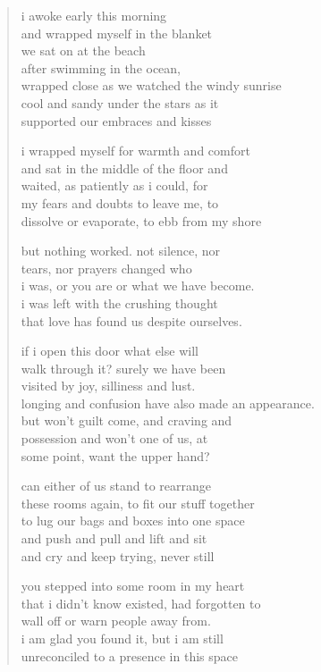 
\begin{verse} %
i awoke early this morning \\
and wrapped myself in the blanket \\
we sat on at the beach \\
after swimming in the ocean, \\
wrapped close as we watched the windy sunrise \\
cool and sandy under the stars as it \\
supported our embraces and kisses

i wrapped myself for warmth and comfort \\
and sat in the middle of the floor and \\
waited, as patiently as i could, for  \\
my fears and doubts to leave me, to  \\
dissolve or evaporate, to ebb from my shore

but nothing worked. not silence, nor \\
tears, nor prayers changed who \\
i was, or you are or what we have become. \\
i was left with the crushing thought \\
that love has found us despite ourselves.

if i open this door what else will  \\
walk through it? surely we have been \\
visited by joy, silliness and lust. \\
longing and confusion have also made an appearance. \\
but won't guilt come, and craving and \\
possession and won't one of us, at \\
some point, want the upper hand?

can either of us stand to rearrange  \\
these rooms again, to fit our stuff together \\
to lug our bags and boxes into one space \\
and push and pull and lift and sit \\
and cry and keep trying, never still

you stepped into some room in my heart \\
that i didn't know existed, had forgotten to \\
wall off or warn people away from. \\
i am glad you found it, but i am still \\
unreconciled to a presence in this space


\end{verse}
